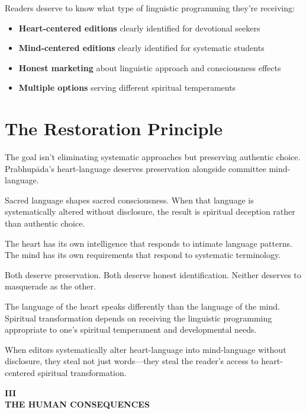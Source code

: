 \documentclass[11pt,twoside]{book}
\makeatletter
\def\cleardoublepage{\clearpage\if@twoside \ifodd\c@page\else\hbox{}\thispagestyle{empty}\newpage\if@twocolumn\hbox{}\newpage\fi\fi\fi}
\makeatother
\begin{document}
Readers deserve to know what type of linguistic programming they're receiving:

\begin{itemize}
\item \textbf{\textbf{Heart-centered editions}} clearly identified for devotional seekers
\item \textbf{\textbf{Mind-centered editions}} clearly identified for systematic students
\item \textbf{\textbf{Honest marketing}} about linguistic approach and consciousness effects
\item \textbf{\textbf{Multiple options}} serving different spiritual temperaments
\end{itemize}
\section*{The Restoration Principle}
\label{sec:org7140729}

The goal isn't eliminating systematic approaches but preserving authentic choice. Prabhupāda's heart-language deserves preservation alongside committee mind-language.

Sacred language shapes sacred consciousness. When that language is systematically altered without disclosure, the result is spiritual deception rather than authentic choice.

The heart has its own intelligence that responds to intimate language patterns. The mind has its own requirements that respond to systematic terminology.

Both deserve preservation. Both deserve honest identification. Neither deserves to masquerade as the other.

The language of the heart speaks differently than the language of the mind. Spiritual transformation depends on receiving the linguistic programming appropriate to one's spiritual temperament and developmental needs.

When editors systematically alter heart-language into mind-language without disclosure, they steal not just words—they steal the reader's access to heart-centered spiritual transformation.

\cleardoublepage
\thispagestyle{empty}
\vspace*{0.25\textheight}
\begin{center}
{\Huge\bfseries\MakeUppercase{\textbf{III}}}\\[0.5cm]
{\huge\bfseries THE HUMAN CONSEQUENCES}
\end{center}
\vspace*{\fill}
\clearpage
\thispagestyle{empty} %
\mbox{}
\newpage
\end{document}
